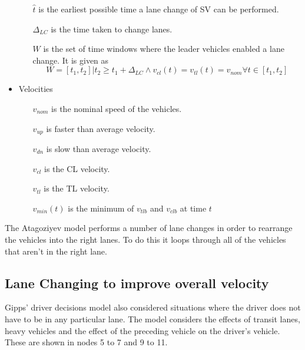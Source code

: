 \begin{itemize}
\begin{itemize}
\item[$\hat{t}$] is the earliest possible time a lane change of SV can be performed.
\item[$\Delta_{LC}$] is the time taken to change lanes.
\item[$W$] is the set of time windows where the leader vehicles enabled a lane change. It is given as 
\begin{equation*}
W = {[t_1,t_2]|t_2 \ge t_1 + \Delta_{LC} \land v_{cl}(t) = v_{tl}(t) = v_{nom} \forall t \in [t_1,t_2]}
\end{equation*}
\end{itemize}
\item Velocities
\begin{itemize}
\item[$v_{nom}$] is the nominal speed of the vehicles.
\item[$v_{up}$] is faster than average velocity.
\item[$v_{dn}$] is slow than average velocity.
\item[$v_{cl}$] is the CL velocity.
\item[$v_{tl}$] is the TL velocity.
\item[$v_{min}(t)$] is the minimum of $v_{tlb}$ and $v_{clb}$ at time $t$
\end{itemize}
\end{itemize}

The Atagoziyev model performs a number of lane changes in order to rearrange the vehicles into the right lanes. To do this it loops through all of the vehicles that aren't in the right lane.


\subsection{Lane Changing to improve overall velocity}
\label{subsec:Lane Changing to improve overall velocity}
Gipps' driver decisions model also considered situations where the driver does not have to be in any particular lane. The model considers the effects of transit lanes, heavy vehicles and the effect of the preceding vehicle on the driver's vehicle. These are shown in nodes 5 to 7 and 9 to 11.

